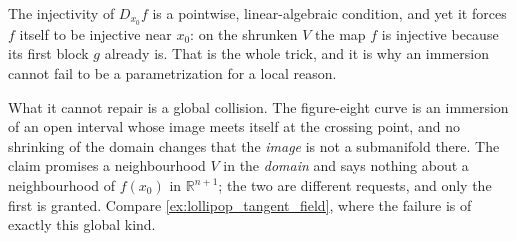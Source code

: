 \begin{example}
\begin{remark}
The injectivity of $D_{x_0}f$ is a pointwise, linear-algebraic condition, and yet it forces $f$
itself to be injective near $x_0$: on the shrunken $V$ the map $f$ is injective because its first
block $g$ already is. That is the whole trick, and it is why an immersion cannot fail to be a
parametrization for a local reason.

What it cannot repair is a global collision. The figure-eight curve is an immersion of an open
interval whose image meets itself at the crossing point, and no shrinking of the domain changes
that the \emph{image} is not a submanifold there. The claim promises a neighbourhood $V$ in the
\emph{domain} and says nothing about a neighbourhood of $f(x_0)$ in $\mathbb{R}^{n+1}$; the two
are different requests, and only the first is granted. Compare
\cref{ex:lollipop_tangent_field}, where the failure is of exactly this global kind.
\end{remark}
\end{example}

